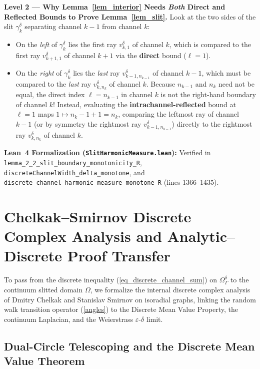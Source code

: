 \documentclass[11pt,reqno]{amsart}
\numberwithin{equation}{section}
\newcommand{\eps}{\varepsilon}
\begin{document}
\begin{leveltwo}
\noindent\textbf{\textcolor{l2border}{Level 2 --- Why Lemma~\ref{lem_interior} Needs \emph{Both} Direct and Reflected Bounds to Prove Lemma~\ref{lem_slit}.}}
Look at the two sides of the slit $\gamma_k^{\delta}$ separating channel $k-1$ from channel $k$:
\begin{itemize}
\item On the \emph{left} of $\gamma_k^{\delta}$ lies the first ray $v_{k,1}^{\delta}$ of channel $k$, which is compared to the first ray $v_{k+1,1}^{\delta}$ of channel $k+1$ via the \textbf{direct} bound ($\ell = 1$).
\item On the \emph{right} of $\gamma_k^{\delta}$ lies the \emph{last} ray $v_{k-1, n_{k-1}}^{\delta}$ of channel $k-1$, which must be compared to the \emph{last} ray $v_{k, n_k}^{\delta}$ of channel $k$. Because $n_{k-1}$ and $n_k$ need not be equal, the direct index $\ell = n_{k-1}$ in channel $k$ is not the right-hand boundary of channel $k$! Instead, evaluating the \textbf{intrachannel-reflected} bound at $\ell = 1$ maps $1 \mapsto n_k - 1 + 1 = n_k$, comparing the leftmost ray of channel $k-1$ (or by symmetry the rightmost ray $v_{k-1, n_{k-1}}^{\delta}$) directly to the rightmost ray $v_{k, n_k}^{\delta}$ of channel $k$.
\end{itemize}
\noindent\textbf{\textcolor{leannote}{Lean~4 Formalization (\texttt{SlitHarmonicMeasure.lean}):}} Verified in \texttt{lemma\_2\_2\_slit\_boundary\_monotonicity\_R}, \texttt{discreteChannelWidth\_delta\_monotone}, and \texttt{discrete\_channel\_harmonic\_measure\_monotone\_R} (lines 1366--1435).
\end{leveltwo}

\section{Chelkak--Smirnov Discrete Complex Analysis and Analytic--Discrete Proof Transfer}

To pass from the discrete inequality (\ref{eq_discrete_channel_sum}) on $\varOmega_{\varGamma}^{\delta}$ to the continuum slitted domain $\varOmega$, we formalize the internal discrete complex analysis of Dmitry Chelkak and Stanislav Smirnov \cite{CS} on isoradial graphs, linking the random walk transition operator (\ref{angles}) to the Discrete Mean Value Property, the continuum Laplacian, and the Weierstrass $\eps$-$\delta$ limit.

\subsection{Dual-Circle Telescoping and the Discrete Mean Value Theorem}
\end{document}
